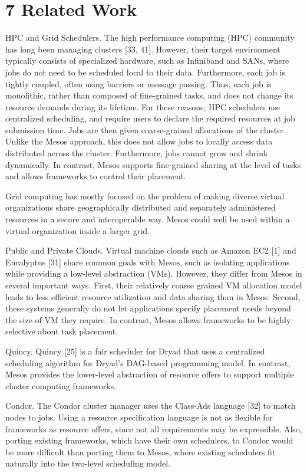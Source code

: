 \documentclass[
]{article}
\begin{document}
\section{7 Related Work}\label{related-work}

HPC and Grid Schedulers. The high performance computing (HPC) community
has long been managing clusters {[}33, 41{]}. However, their target
environment typically consists of specialized hardware, such as
Infiniband and SANs, where jobs do not need to be scheduled local to
their data. Furthermore, each job is tightly coupled, often using
barriers or message passing. Thus, each job is monolithic, rather than
composed of fine-grained tasks, and does not change its resource demands
during its lifetime. For these reasons, HPC schedulers use centralized
scheduling, and require users to declare the required resources at job
submission time. Jobs are then given coarse-grained allocations of the
cluster. Unlike the Mesos approach, this does not allow jobs to locally
access data distributed across the cluster. Furthermore, jobs cannot
grow and shrink dynamically. In contrast, Mesos supports fine-grained
sharing at the level of tasks and allows frameworks to control their
placement.

Grid computing has mostly focused on the problem of making diverse
virtual organizations share geographically distributed and separately
administered resources in a secure and interoperable way. Mesos could
well be used within a virtual organization inside a larger grid.

Public and Private Clouds. Virtual machine clouds such as Amazon EC2
{[}1{]} and Eucalyptus {[}31{]} share common goals with Mesos, such as
isolating applications while providing a low-level abstraction (VMs).
However, they differ from Mesos in several important ways. First, their
relatively coarse grained VM allocation model leads to less efficient
resource utilization and data sharing than in Mesos. Second, these
systems generally do not let applications specify placement needs beyond
the size of VM they require. In contrast, Mesos allows frameworks to be
highly selective about task placement.

Quincy. Quincy {[}25{]} is a fair scheduler for Dryad that uses a
centralized scheduling algorithm for Dryad's DAG-based programming
model. In contrast, Mesos provides the lower-level abstraction of
resource offers to support multiple cluster computing frameworks.

Condor. The Condor cluster manager uses the Class-Ads language {[}32{]}
to match nodes to jobs. Using a resource specification language is not
as flexible for frameworks as resource offers, since not all
requirements may be expressible. Also, porting existing frameworks,
which have their own schedulers, to Condor would be more difficult than
porting them to Mesos, where existing schedulers fit naturally into the
two-level scheduling model.
\end{document}
